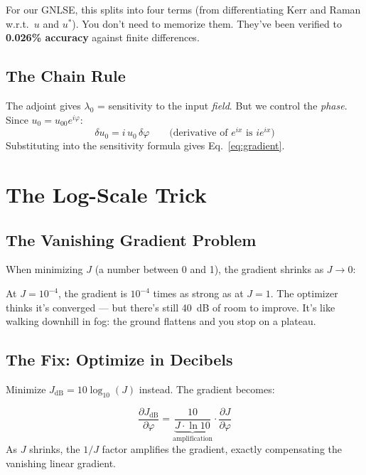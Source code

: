 \documentclass[12pt,a4paper]{article}
\newcommand{\pdv}[2]{\frac{\partial #1}{\partial #2}}
\begin{document}
For our GNLSE, this splits into four terms (from differentiating Kerr and Raman w.r.t.\ $u$ and $u^*$). You don't need to memorize them. They've been verified to \textbf{0.026\% accuracy} against finite differences.

\subsection{The Chain Rule}

The adjoint gives $\lambda_0$ = sensitivity to the input \emph{field}. But we control the \emph{phase}. Since $u_0 = u_{00}e^{i\varphi}$:
\begin{equation}
\delta u_0 = i\,u_0\,\delta\varphi \qquad\text{(derivative of $e^{ix}$ is $ie^{ix}$)}
\end{equation}
Substituting into the sensitivity formula gives Eq.~\eqref{eq:gradient}.


\section{The Log-Scale Trick}

\subsection{The Vanishing Gradient Problem}

When minimizing $J$ (a number between 0 and 1), the gradient shrinks as $J \to 0$:

\begin{warning}
At $J = 10^{-4}$, the gradient is $10^{-4}$ times as strong as at $J = 1$. The optimizer thinks it's converged --- but there's still 40~dB of room to improve. It's like walking downhill in fog: the ground flattens and you stop on a plateau.
\end{warning}

\subsection{The Fix: Optimize in Decibels}

Minimize $J_{\text{dB}} = 10\log_{10}(J)$ instead. The gradient becomes:
\begin{keyeq}
\begin{equation}
\pdv{J_{\text{dB}}}{\varphi} = \underbrace{\frac{10}{J\cdot\ln 10}}_{\text{amplification}} \cdot \pdv{J}{\varphi}
\label{eq:log_cost}
\end{equation}
As $J$ shrinks, the $1/J$ factor amplifies the gradient, exactly compensating the vanishing linear gradient.
\end{keyeq}
\end{document}
